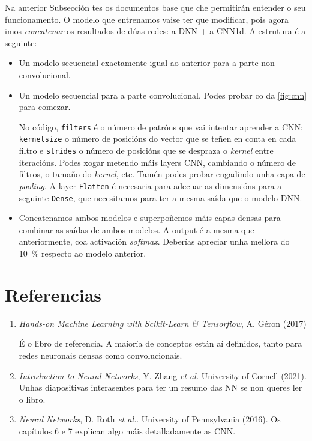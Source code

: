 \documentclass[11pt, a4paper]{article}
\begin{document}
Na anterior Subsección tes os documentos base que che permitirán entender o seu funcionamento. O modelo que entrenamos vaise ter que modificar, pois agora imos \textit{concatenar} os resultados de dúas redes: a DNN + a CNN1d. A estrutura é a seguinte:

\begin{itemize}
    \item Un modelo secuencial exactamente igual ao anterior para a parte non convolucional.
    \item Un modelo secuencial para a parte convolucional. Podes probar co da \autoref{fig:cnn} para comezar.

    No código, \verb|filters| é o número de patróns que vai intentar aprender a CNN; \texttt{kernelsize} o número de posicións do vector que se teñen en conta en cada  filtro e \verb|strides| o número de posicións que se despraza o \textit{kernel} entre iteracións. Podes xogar metendo máis layers CNN, cambiando o número de filtros, o tamaño do \textit{kernel}, etc. Tamén podes probar engadindo unha capa de \textit{pooling}. A layer \verb|Flatten| é necesaria para adecuar as dimensións para a seguinte \verb|Dense|, que necesitamos para ter a mesma saída que o modelo DNN.

    \item Concatenamos ambos modelos e superpoñemos máis capas densas para combinar as saídas de ambos modelos. A output é a mesma que anteriormente, coa activación \textit{softmax}. Deberías apreciar unha mellora do \qty{10}{\percent} respecto ao modelo anterior.
\end{itemize}

\section{Referencias}
\begin{enumerate}
    \item \textit{Hands-on Machine Learning with Scikit-Learn \& Tensorflow}, A. Géron (2017)
    
    É o libro de referencia. A maioría de conceptos están aí definidos, tanto para redes neuronais densas como convolucionais.

    \item \textit{Introduction to Neural Networks}, Y. Zhang \textit{et al.} University of Cornell (2021). Unhas diapositivas interasentes para ter un resumo das NN se non queres ler o libro.
    \item \textit{Neural Networks}, D. Roth \textit{et al.}. University of Pennsylvania (2016). Os capítulos 6 e 7 explican algo máis detalladamente as CNN.
\end{enumerate}
\end{document}
